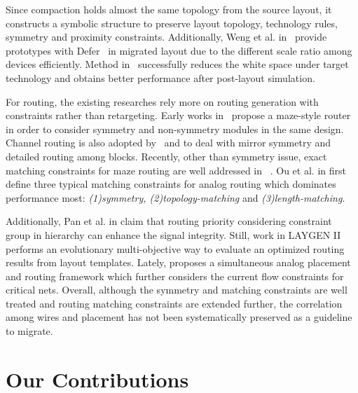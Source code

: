       Since compaction holds almost the same topology from the source layout, it constructs a symbolic structure to preserve layout topology, technology rules, symmetry and proximity constraints. Additionally, Weng et al. in~\cite{ALP_YPWeng_iccad2011} provide prototypes with Defer~\cite{defer_jackey_tcad10} in migrated layout due to the different scale ratio among devices efficiently. Method in~\cite{ALP_YPWeng_iccad2011} successfully reduces the white space under target technology and obtains better performance after post-layout simulation. 

      For routing, the existing researches rely more on routing generation with constraints rather than retargeting. Early works in~\cite{KOAN_ANAGRAMII-JSSC1991,aicon_malE_tcad96,ppraic_Linfu_iccad2010} propose a maze-style router in order to consider symmetry and non-symmetry modules in the same design. Channel routing is also adopted by~\cite{cbcrams_UChoudhury_tcad93} and \cite{aicon_malE_tcad96} to deal with mirror symmetry and detailed routing among blocks. Recently, other than symmetry issue, exact matching constraints for maze routing are well addressed in ~\cite{AnalogRouteMatching-iccad2009}. Ou et al. in \cite{numarmc_HCOu_dac12} first define three typical matching constraints for analog routing which dominates performance most: {\it(1)symmetry, (2)topology-matching} and {\it (3)length-matching}. 

      Additionally, Pan et al. in \cite{Pan_CGR_ICCAD2012} claim that routing priority considering constraint group in hierarchy can enhance the signal integrity. Still, work in LAYGEN II \cite{LAYGENII_TCAD13} performs an evolutionary multi-objective way to evaluate an optimized routing results from layout templates. Lately, \cite{SAPR_DAC13} proposes a simultaneous analog placement and routing framework which further considers the current flow constraints for critical nets. Overall, although the symmetry and matching constraints are well treated and routing matching constraints are extended further, the correlation among wires and placement has not been systematically preserved as a guideline to migrate.

  \section{Our Contributions}\label{sec:contribution}

